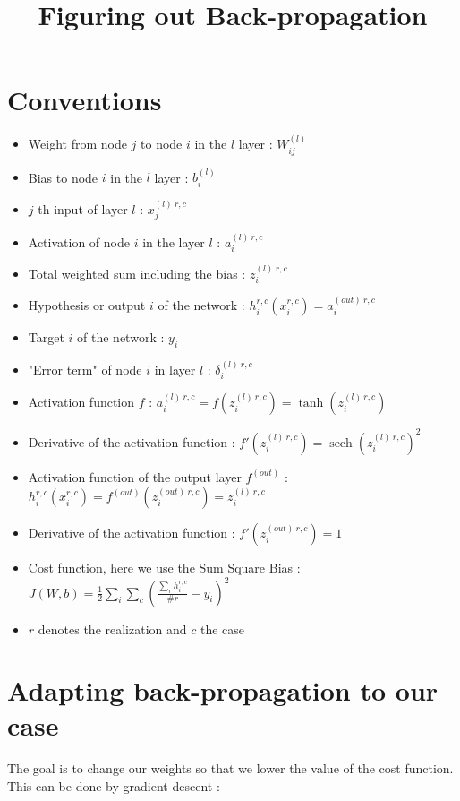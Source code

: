 \documentclass[a4paper,12pt,twoside]{article}
\DeclareMathOperator{\sech}{sech}
\begin{document}
\title{Figuring out Back-propagation}
\maketitle

\section{Conventions}
\begin{itemize}
\item Weight from node $j$ to node $i$ in the $l$ layer : $W^{(l)}_{ij}$
\item Bias to node $i$ in the $l$ layer : $b_i^{(l)}$
\item $j$-th input of layer $l$ : $x_j^{(l)~r,c}$
\item Activation of node $i$ in the layer $l$ : $a_i^{(l)~r,c}$
\item Total weighted sum including the bias : $z_i^{(l)~r,c}$
\item Hypothesis or output $i$ of the network : $h_{i}^{r,c}(x^{r,c}_i) = a^{(out)~r,c}_i$
\item Target $i$ of the network : $y_i$
\item "Error term" of node $i$ in layer $l$ : $\delta_i^{(l)~r,c}$
\item Activation function $f$ : $a_i^{(l)~r,c}=f(z_i^{(l)~r,c})=\tanh(z_i^{(l)~r,c})$
\item Derivative of the activation function : $f'(z_i^{(l)~r,c})=\sech(z_i^{(l)~r,c})^2$
\item Activation function of the output layer $f^{(out)}$ : \\$h_{i}^{r,c}(x^{r,c}_i)=f^{(out)}(z_i^{(out)~r,c})=z_i^{(l)~r,c}$
\item Derivative of the activation function : $f'(z_i^{(out)~r,c})=1$
\item Cost function, here we use the Sum Square Bias : \\ $J(W,b) = \frac{1}{2} \sum_i \sum_c \left( \frac{\sum_r h_{i}^{r,c}}{\#r} - y_i \right)^2$
\item $r$ denotes the realization and $c$ the case
\end{itemize}

\section{Adapting back-propagation to our case}

The goal is to change our weights so that we lower the value of the cost function. This can be done by gradient descent : 
\end{document}
